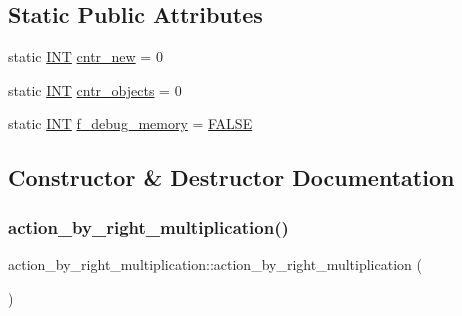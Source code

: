 \subsection*{Static Public Attributes}
\begin{DoxyCompactItemize}
\item 
static \mbox{\hyperlink{galois_8h_a09fddde158a3a20bd2dcadb609de11dc}{I\+NT}} \mbox{\hyperlink{classaction__by__right__multiplication_a36c5c51cd1f8710abfd54c5b10377891}{cntr\+\_\+new}} = 0
\item 
static \mbox{\hyperlink{galois_8h_a09fddde158a3a20bd2dcadb609de11dc}{I\+NT}} \mbox{\hyperlink{classaction__by__right__multiplication_a44acdab89205c0eb5a670d63c44ebb9a}{cntr\+\_\+objects}} = 0
\item 
static \mbox{\hyperlink{galois_8h_a09fddde158a3a20bd2dcadb609de11dc}{I\+NT}} \mbox{\hyperlink{classaction__by__right__multiplication_a7c94cc20eb26a24da0ee63b8324a4b46}{f\+\_\+debug\+\_\+memory}} = \mbox{\hyperlink{nauty_8h_aa93f0eb578d23995850d61f7d61c55c1}{F\+A\+L\+SE}}
\end{DoxyCompactItemize}


\subsection{Constructor \& Destructor Documentation}
\mbox{\label{classaction__by__right__multiplication_a5364287ec4e3ee3c032d961d71b82260}} 
\subsubsection{\texorpdfstring{action\+\_\+by\+\_\+right\+\_\+multiplication()}{action\_by\_right\_multiplication()}}
{\footnotesize\ttfamily action\+\_\+by\+\_\+right\+\_\+multiplication\+::action\+\_\+by\+\_\+right\+\_\+multiplication (\begin{DoxyParamCaption}{ }\end{DoxyParamCaption})}

\mbox{\label{classaction__by__right__multiplication_a93099e0e51f0732bfdff3b20d610b506}} 
